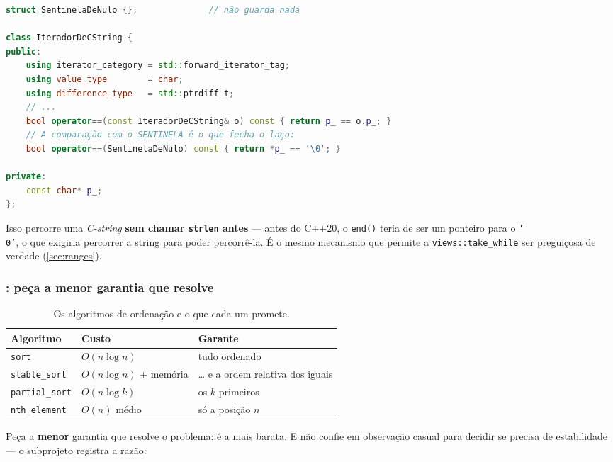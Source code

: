 \begin{lstlisting}[style=bt, language=C++,
    caption={Um sentinela em \texttt{src/stl/demo\_iterators.hpp} (condensado).}]
struct SentinelaDeNulo {};              // não guarda nada

class IteradorDeCString {
public:
    using iterator_category = std::forward_iterator_tag;
    using value_type        = char;
    using difference_type   = std::ptrdiff_t;
    // ...
    bool operator==(const IteradorDeCString& o) const { return p_ == o.p_; }
    // A comparação com o SENTINELA é o que fecha o laço:
    bool operator==(SentinelaDeNulo) const { return *p_ == '\0'; }

private:
    const char* p_;
};
\end{lstlisting}

Isso percorre uma \emph{C-string} \textbf{sem chamar \texttt{strlen} antes} ---
antes do C++20, o \texttt{end()} teria de ser um ponteiro para o \texttt{'\\0'},
o que exigiria percorrer a string para poder percorrê-la. É o mesmo mecanismo
que permite a \texttt{views::take\_while} ser preguiçosa de verdade
(\cref{sec:ranges}).

\subsubsection{: peça a menor garantia que resolve}

\begin{table}[htbp]
\centering
\caption{Os algoritmos de ordenação e o que cada um promete.}
\label{tab:ordenar}
\footnotesize
\begin{tabular}{@{}lll@{}}
\toprule
\textbf{Algoritmo} & \textbf{Custo} & \textbf{Garante} \\
\midrule
\texttt{sort}         & $O(n \log n)$ & tudo ordenado \\
\texttt{stable\_sort} & $O(n \log n)$ + memória & \ldots{} e a ordem relativa dos iguais \\
\texttt{partial\_sort}& $O(n \log k)$ & os $k$ primeiros \\
\texttt{nth\_element} & $O(n)$ médio  & só a posição $n$ \\
\bottomrule
\end{tabular}
\end{table}

Peça a \textbf{menor} garantia que resolve o problema: é a mais barata. E não
confie em observação casual para decidir se precisa de estabilidade --- o
subprojeto registra a razão:

